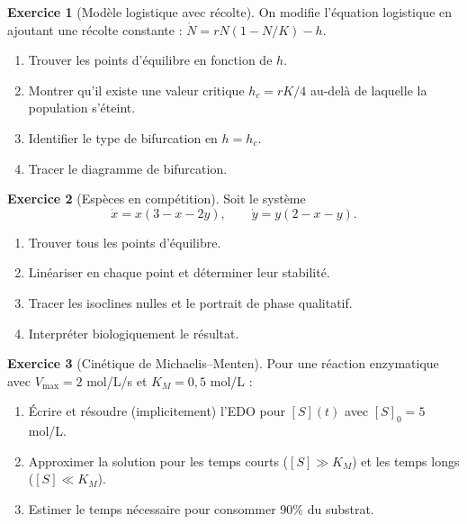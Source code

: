 \documentclass[12pt,a4paper,openany]{book}
\theoremstyle{definition}
\newtheorem{exercice}{Exercice}[chapter]
\theoremstyle{plain}
\theoremstyle{remark}
\begin{document}
\begin{exercice}[Modèle logistique avec récolte]
\label{exo:logistique-recolte}
On modifie l'équation logistique en ajoutant une récolte constante :
$\dot{N} = rN(1 - N/K) - h$.
\begin{enumerate}[label=\alph*)]
  \item Trouver les points d'équilibre en fonction de $h$.
  \item Montrer qu'il existe une valeur critique
        $h_c = rK/4$ au-delà de laquelle la population
        s'éteint.
  \item Identifier le type de bifurcation en $h = h_c$.
  \item Tracer le diagramme de bifurcation.
\end{enumerate}
\end{exercice}

\begin{exercice}[Espèces en compétition]
\label{exo:competition}
Soit le système
\[
\dot{x} = x(3 - x - 2y), \qquad \dot{y} = y(2 - x - y).
\]
\begin{enumerate}[label=\alph*)]
  \item Trouver tous les points d'équilibre.
  \item Linéariser en chaque point et déterminer leur stabilité.
  \item Tracer les isoclines nulles et le portrait de phase qualitatif.
  \item Interpréter biologiquement le résultat.
\end{enumerate}
\end{exercice}

\begin{exercice}[Cinétique de Michaelis--Menten]
\label{exo:michaelis}
Pour une réaction enzymatique avec $V_{\max} = 2$ mol/L/s et
$K_M = 0{,}5$ mol/L :
\begin{enumerate}[label=\alph*)]
  \item Écrire et résoudre (implicitement) l'EDO pour $[S](t)$
        avec $[S]_0 = 5$ mol/L.
  \item Approximer la solution pour les temps courts ($[S] \gg K_M$)
        et les temps longs ($[S] \ll K_M$).
  \item Estimer le temps nécessaire pour consommer $90\%$ du
        substrat.
\end{enumerate}
\end{exercice}
\end{document}
